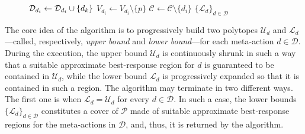 \begin{figure}
\begin{minipage}{0.42\textwidth}
\begin{algorithm}[H]
\begin{algorithmic}[1]
				\State $\mathcal{D}_{d_i} \gets \mathcal{D}_{d_i} \cup \{d_k\}$\label{line:add_di}
				\EndIf
				\State $V_{d_i} \gets V_{d_i} \setminus \{p\}$
				\label{line:partition_loop3}
				\EndWhile
				\State $\mathcal{C} \leftarrow \mathcal{C} \setminus \{d_i\}$
				\EndWhile
				\State \Return  $\{\mathcal{L}_{d}\}_{d\in  \mathcal{D} } $
			\end{algorithmic}
		\end{algorithm}
	\end{minipage}
\end{figure}
%
The core idea of the algorithm is to progressively build two polytopes $\mathcal{U}_{d}$ and $\mathcal{L}_{d}$---called, respectively, \emph{upper bound} and \emph{lower bound}---for each meta-action $d \in \mathcal{D}$.
%
During the execution, the upper bound $\mathcal{U}_{d}$ is continuously shrunk in such a way that a suitable approximate best-response region for $d$ is guaranteed to be contained in $\mathcal{U}_{d}$, while the lower bound $\mathcal{L}_{d}$ is progressively expanded so that it is contained in such a region.
%
%
%
%
The algorithm may terminate in two different ways.
%
The first one is when $\mathcal{L}_{d} = \mathcal{U}_{d}$ for every $d \in \mathcal{D}$.
%
In such a case, the lower bounds $\{\mathcal{L}_{d}\}_{d\in  \mathcal{D}}$ constitutes a cover of $\mathcal{P}$ made of suitable approximate best-response regions for the meta-actions in $\mathcal{D}$, and, thus, it is returned by the algorithm.
%
